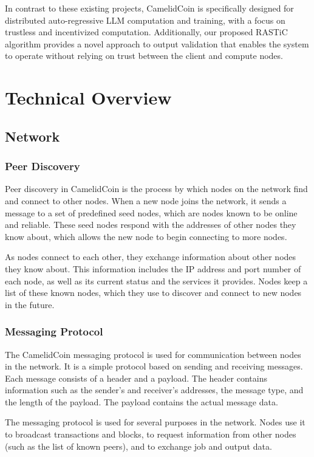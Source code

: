\documentclass{article}
\begin{document}
In contrast to these existing projects, CamelidCoin is specifically designed for distributed auto-regressive LLM computation and training, with a focus on trustless and incentivized computation.
Additionally, our proposed \ac{RASTiC} algorithm provides a novel approach to output validation that enables the system to operate without relying on trust between the client and compute nodes.

\section{Technical Overview}

\subsection{Network}
\subsubsection{Peer Discovery}

Peer discovery in CamelidCoin is the process by which nodes on the network find and connect to other nodes. 
When a new node joins the network, it sends a message to a set of predefined seed nodes, which are nodes known to be online and reliable. 
These seed nodes respond with the addresses of other nodes they know about, which allows the new node to begin connecting to more nodes.

As nodes connect to each other, they exchange information about other nodes they know about. 
This information includes the IP address and port number of each node, as well as its current status and the services it provides.
Nodes keep a list of these known nodes, which they use to discover and connect to new nodes in the future.

\subsubsection{Messaging Protocol}

The CamelidCoin messaging protocol is used for communication between nodes in the network.
It is a simple protocol based on sending and receiving messages.
Each message consists of a header and a payload.
The header contains information such as the sender's and receiver's addresses, the message type, and the length of the payload.
The payload contains the actual message data.

The messaging protocol is used for several purposes in the network.
Nodes use it to broadcast transactions and blocks, to request information from other nodes (such as the list of known peers), and to exchange job and output data.
\end{document}
